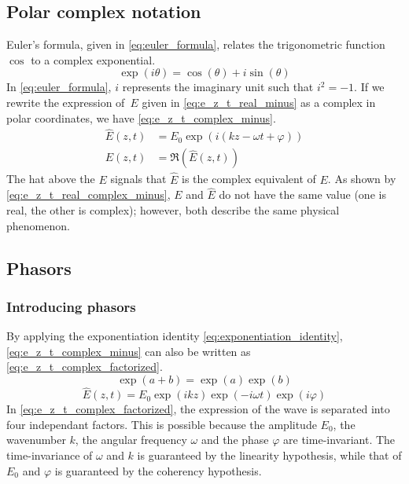 \subsection{Polar complex notation}
\label{sec:polar_complex_notation}
Euler's formula, given in \cref{eq:euler_formula}, relates the trigonometric function $\cos$ to a complex exponential.
\begin{equation}    
    \exp(i\theta) = \cos(\theta) + i\sin(\theta) \label{eq:euler_formula}
\end{equation}
In \cref{eq:euler_formula}, $i$ represents the imaginary unit such that $i^2=-1$.
If we rewrite the expression of~$E$ given in \cref{eq:e_z_t_real_minus} as a complex in polar coordinates, we have \cref{eq:e_z_t_complex_minus}.
\begin{align}
   \hat{E}(z, t) &= E_0 \exp(i(kz - \omega t + \varphi))
   \label{eq:e_z_t_complex_minus}
   \\
   E(z, t) &= \Re(\hat{E}(z, t))
   \label{eq:e_z_t_real_complex_minus}
\end{align}
The hat above the $E$ signals that $\hat{E}$ is the complex equivalent of $E$.
As shown by \cref{eq:e_z_t_real_complex_minus}, $E$ and $\hat{E}$ do not have the same value (one is real, the other is complex);
however, both describe the same physical phenomenon.



\subsection{Phasors}

\subsubsection{Introducing phasors}
By applying the exponentiation identity \cref{eq:exponentiation_identity},
\cref{eq:e_z_t_complex_minus} can also be written as \cref{eq:e_z_t_complex_factorized}.
\begin{equation}
    \exp(a+b) = \exp(a) \exp(b)
    \label{eq:exponentiation_identity}
\end{equation}
\begin{equation}
    \hat{E}(z, t)
    =
    E_0 \exp(ikz) \exp(-i\omega t) \exp({i \varphi})
    \label{eq:e_z_t_complex_factorized}
\end{equation}
In \cref{eq:e_z_t_complex_factorized}, the expression of the wave is separated into four independant factors.
This is possible because the amplitude $E_0$, the wavenumber $k$, the angular frequency $\omega$ and the phase $\varphi$ are time-invariant.
The time-invariance of $\omega$ and $k$ is guaranteed by the linearity hypothesis, while that of $E_0$ and $\varphi$ is guaranteed by the coherency hypothesis.

